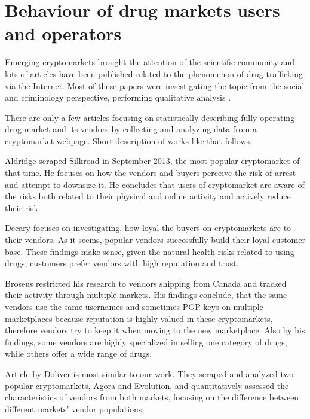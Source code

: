 \documentclass[
  digital, %
  table,   %
  lof,     %
  lot,     %
  oneside
]{fithesis3}
\begin{document}
\section{Behaviour of drug markets users and operators}

Emerging cryptomarkets brought the attention of the scientific community
and lots of articles have been published related to the phenomenon of drug trafficking via the Internet.
Most of these papers were investigating the topic from the social
and criminology perspective, performing qualitative analysis
\cite{aldridge2014not}\cite{barratt2014use}\cite{christin2013traveling}\cite{dolliver2015criminogenic}\cite{van2013silk}\cite{walsh2011drugs}\cite{martin2014lost}.

There are only a few articles focusing on statistically describing fully operating drug market and its vendors
by collecting and analyzing data from a cryptomarket webpage. Short description of works like that follows.

Aldridge \cite{aldridge2017delivery} scraped Silkroad in September 2013, the most popular cryptomarket of that time.
He focuses on how the vendors and buyers perceive the risk of arrest and attempt to downsize it.
He concludes that users of cryptomarket are aware of the risks both related to their physical and online activity
and actively reduce their risk.

Decary \cite{decary2017repeat} focuses on investigating, how loyal the buyers on cryptomarkets are to their vendors. As it seems, popular vendors successfully build their loyal customer base. These findings make sense, given the natural health risks related to using drugs,
customers prefer vendors with high reputation and trust.

Broseus \cite{broseus2016studying} restricted his research to vendors shipping from Canada
and tracked their activity through multiple markets. His findings conclude, that the same vendors
use the same usernames and sometimes PGP keys on multiple marketplaces because reputation
is highly valued in these cryptomarkets, therefore vendors try to keep it when moving to the new marketplace.
Also by his findings, some vendors are highly specialized in selling one category of drugs, while others offer a wide range of drugs.

Article by Doliver \cite{dolliver2016characteristics} is most similar to our work.
They scraped and analyzed two popular cryptomarkets, Agora and Evolution, and quantitatively assessed
the characteristics of vendors from both markets, focusing on the difference
 between different markets' vendor populations.
\end{document}
